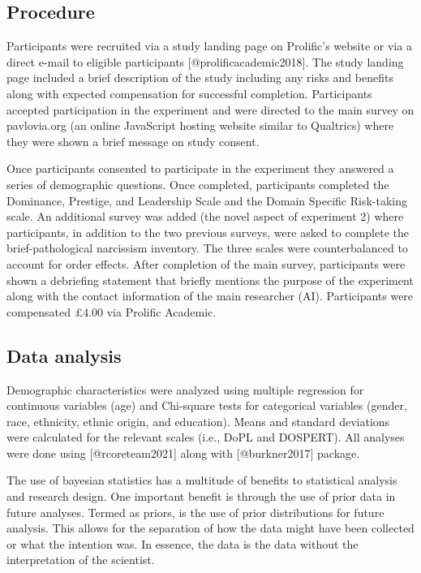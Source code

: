 \documentclass[
]{article}
\begin{document}
\hypertarget{procedure-1}{%
\subsection{Procedure}\label{procedure-1}}

Participants were recruited via a study landing page on Prolific's
website or via a direct e-mail to eligible participants
{[}@prolificacademic2018{]}. The study landing page included a brief
description of the study including any risks and benefits along with
expected compensation for successful completion. Participants accepted
participation in the experiment and were directed to the main survey on
pavlovia.org (an online JavaScript hosting website similar to Qualtrics)
where they were shown a brief message on study consent.

Once participants consented to participate in the experiment they
answered a series of demographic questions. Once completed, participants
completed the Dominance, Prestige, and Leadership Scale and the Domain
Specific Risk-taking scale. An additional survey was added (the novel
aspect of experiment 2) where participants, in addition to the two
previous surveys, were asked to complete the brief-pathological
narcissism inventory. The three scales were counterbalanced to account
for order effects. After completion of the main survey, participants
were shown a debriefing statement that briefly mentions the purpose of
the experiment along with the contact information of the main researcher
(AI). Participants were compensated £4.00 via Prolific Academic.

\hypertarget{data-analysis-1}{%
\subsection{Data analysis}\label{data-analysis-1}}

Demographic characteristics were analyzed using multiple regression for
continuous variables (age) and Chi-square tests for categorical
variables (gender, race, ethnicity, ethnic origin, and education). Means
and standard deviations were calculated for the relevant scales (i.e.,
DoPL and DOSPERT). All analyses were done using {[}@rcoreteam2021{]}
along with {[}@burkner2017{]} package.

The use of bayesian statistics has a multitude of benefits to
statistical analysis and research design. One important benefit is
through the use of prior data in future analyses. Termed as priors, is
the use of prior distributions for future analysis. This allows for the
separation of how the data might have been collected or what the
intention was. In essence, the data is the data without the
interpretation of the scientist.
\end{document}
